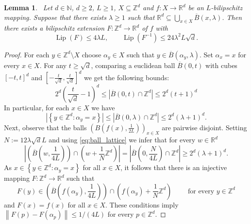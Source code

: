 \documentclass[a4paper, bibliography=totoc]{scrartcl}
\newtheorem{lemma}[define]{Lemma}
\numberwithin{claimcounter}{define}
\newcommand{\R}{\mathbb{R}}
\newcommand{\Z}{\mathbb{Z}}
\newcommand{\N}{\mathbb{N}}
\newcommand{\lip}{\operatorname{Lip}}
\newcommand{\abs}[1]{\left|#1\right|}
\newcommand{\enorm}[1]{\left\|#1\right\|}
\newcommand{\set}[1]{\left\{#1\right\}}
\newcommand{\br}[1]{\left(#1\right)}
\newcommand{\sqbr}[1]{\left[#1\right]}
\newcommand{\cl}[1]{\overline{#1}}
\begin{document}
\begin{lemma}~\label{lemma:ext_to_lattice}
	Let $d\in\N$, $d\geq 2$, $L\geq 1$, $X\subseteq \Z^{d}$ and $f\colon X\to \R^{d}$ be an $L$-bilipschitz mapping. Suppose that there exists $\lambda\geq 1$ such that $\R^{d}\subseteq \bigcup_{x\in X}\cl{B}(x,\lambda)$. Then there exists a bilipschitz extension $F\colon \Z^{d}\to\R^{d}$ of $f$ with
	\begin{equation*}
	\lip(F)\leq 4\lambda L, \qquad \lip(F^{-1})\leq 24\lambda^{2}L\sqrt{d}.
	\end{equation*}
\end{lemma}
\begin{proof}
	For each $y\in\Z^{d}\setminus X$ choose $\alpha_{y}\in X$ such that $y\in \cl{B}(\alpha_{y},\lambda)$. Set $\alpha_{x}=x$ for every $x\in X$.
	For any $t\geq\sqrt{d}$, comparing a euclidean ball $\cl{B}(0,t)$ with cubes $[-t, t]^d$ and $\sqbr{-\frac{t}{\sqrt{d}},\frac{t}{\sqrt{d}}}^d$ we get the following bounds:
	\begin{equation}\label{eq:ball_lattice}
	2^d\br{\frac{t}{\sqrt{d}}-1}^d\leq\abs{\cl{B}(0,t)\cap \Z^{d}}\leq 2^d(t+1)^d
	\end{equation}
	In particular, for each $x\in X$ we have
	\begin{equation*}
	\abs{\set{y\in\Z^{d}\colon \alpha_{y}=x}}\leq \abs{\cl{B}(0,\lambda)\cap \Z^{d}}\leq 2^d(\lambda+1)^{d}.
	\end{equation*}
	Next, observe that the balls $(B(f(x),\frac{1}{2L}))_{x\in X}$ are pairwise disjoint. Setting $N:=12\lambda\sqrt{d}L$ and using \eqref{eq:ball_lattice} we infer that for every $w\in\R^d$
	\[
	\abs{\br{\cl{B}\br{w,\frac{1}{4L}}}\cap \br{w+\frac{1}{N}\Z^{d}}}=\abs{\cl{B}\br{0,\frac{N}{4L}}\cap \Z^{d}}\geq 2^d(\lambda+1)^d.
	\]
	As $x\in\set{y\in \Z^{d}\colon \alpha_{y}=x}$ for all $x\in X$, it follows that there is an injective mapping $F\colon \Z^{d}\to \R^d$ such that 
	\begin{equation*}\label{eq:iota_lattice}
	F(y)\in \br{\cl{B}\br{f(\alpha_{y}),\frac{1}{4L}}}\cap \br{f(\alpha_{y})+\frac{1}{N}\Z^{d}}\qquad\text{ for every $y\in \Z^{d}$}
	\end{equation*}
	and $F(x)=f(x)$ for all $x\in X$.
	These conditions imply $\enorm{F(p)-F(\alpha_p)}\leq 1/(4L)$ for every $p\in\Z^d$.
	

\end{proof}
\end{document}
